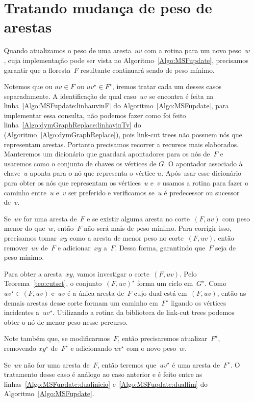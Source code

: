 \section{Tratando mudança de peso de arestas}

Quando atualizamos o peso de uma aresta~$uv$ com a rotina \MSFupdate{} para um novo peso~$w$, cuja implementação pode ser vista no Algoritmo~\ref{Algo:MSFupdate}, precisamos garantir que a floresta~$F$ resultante continuará sendo  de peso mínimo.

Notemos que ou $uv\in F$ ou $uv^\star\in F^\star$, iremos tratar cada um desses casos separadamente.
A identificação de qual caso~$uv$ se encontra é feita na linha~\ref{Algo:MSFupdate:linhauvinF} do Algoritmo~\ref{Algo:MSFupdate}, para implementar essa consulta, não podemos fazer como foi feito linha~\ref{Algo:dymGraphReplace:linhayinTv} do \dymGraphReplace(Algoritmo~\ref{Algo:dymGraphReplace}), pois link-cut trees não possuem nós que representam arestas.
Portanto precisamos recorrer a recursos mais elaborados.
Manteremos um dicionário que guardará apontadores para os nós de~$F$ e usaremos como o conjunto de chaves os vértices de $G$. O apontador associado à chave~$u$ aponta para o nó que representa o vértice $u$.
Após usar esse dicionário para obter os nós que representam os vértices~$u$ e~$v$ usamos a rotina \linkcutPath{} para fazer o caminho entre~$u$ e~$v$ ser preferido e verificamos se~$u$ é predecessor ou sucessor de~$v$.

Se~$uv$ for uma aresta de~$F$ e se existir alguma aresta no corte~$(F, uv)$ com peso menor do que~$w$, então~$F$ não será mais de peso mínimo.
Para corrigir isso, precisamos tomar~$xy$ como a aresta de menor peso no corte~$(F, uv)$,
então remover~$uv$ de~$F$ e adicionar~$xy$ a~$F$.
Dessa forma, garantindo que~$F$ seja de peso mínimo.

Para obter a aresta~$xy$, vamos investigar o corte~$(F, uv)$.
Pelo Teorema~\ref{teo:cutset}, o conjunto~$(F, uv)^\star$ forma um ciclo em~$G^\star$.
Como~$uv^\star\in(F, uv)$ e~$uv$ é a única aresta de~$F$ cujo dual está em~$(F, uv)$, então as demais arestas desse corte formam um caminho em~$F^\star$ ligando os vértices incidentes a~$uv^\star$.
Utilizando a rotina \linkcutMin{}  da biblioteca de link-cut trees podemos obter o nó de menor peso nesse percurso.

Note também que, se modificarmos~$F$, então precisaremos atualizar~$F^\star$, removendo $xy^\star$ de~$F^\star$ e adicionando $uv^\star$ com o novo peso~$w$.

Se~$uv$ não for uma aresta de~$F$, então teremos que~$uv^\star$ é uma aresta de~$F^\star$.
O tratamento desse caso é análogo ao caso anterior e é feito entre as linhas~\ref{Algo:MSFupdate:dualinicio} e~\ref{Algo:MSFupdate:dualfim} do Algoritmo~\ref{Algo:MSFupdate}.


